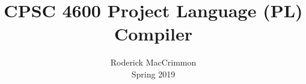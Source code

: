 \documentclass{article}
\begin{document}
\title{CPSC 4600 Project Language (PL) Compiler}
\author{Roderick MacCrimmon \\ Spring 2019}

\maketitle
\end{document}
